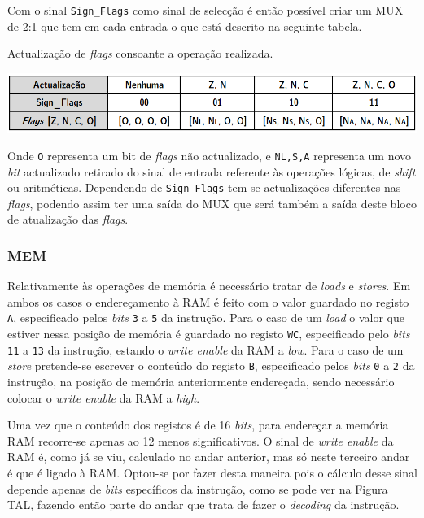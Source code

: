 \documentclass[11pt]{article}
\numberwithin{equation}{section}
\begin{document}
Com o sinal \texttt{Sign\_Flags} como sinal de selecção é então possível criar um MUX de 2:1 que tem em cada entrada o que está descrito na seguinte tabela.

\vspace{1.5mm}
\begin{table}[h]
	\centering
	\caption{Actualização de \textit{flags} consoante a operação realizada.}
	\vspace{-2mm}
 	\includegraphics[keepaspectratio=true, scale=0.45]{tabelas/tabelaFlags}
\end{table}

Onde \texttt{O} representa um bit de \textit{flags} não actualizado, e \texttt{N{\scriptsize {L,S,A}}} representa um novo \textit{bit} actualizado retirado do sinal de entrada referente às operações lógicas, de \textit{shift} ou aritméticas. Dependendo de \texttt{Sign\_Flags} tem-se actualizações diferentes nas \textit{flags}, podendo assim ter uma saída do MUX que será também a saída deste bloco de atualização das \textit{flags}.

\subsubsection{MEM}

Relativamente às operações de memória é necessário tratar de \textit{loads} e \textit{stores}. Em ambos os casos o endereçamento à RAM é feito com o valor guardado no registo \texttt{A}, especificado pelos \textit{bits} \texttt{3} a \texttt{5} da instrução. Para o caso de um \textit{load} o valor que estiver nessa posição de memória é guardado no registo \texttt{WC}, especificado pelo \textit{bits} \texttt{11} a \texttt{13} da instrução, estando o \textit{write enable} da RAM a \textit{low}. Para o caso de um \textit{store} pretende-se escrever o conteúdo do registo \texttt{B}, especificado pelos \textit{bits} \texttt{0} a \texttt{2} da instrução, na posição de memória anteriormente endereçada, sendo necessário colocar o \textit{write enable} da RAM a \textit{high}. 

Uma vez que o conteúdo dos registos é de 16 \textit{bits}, para endereçar a memória RAM recorre-se apenas ao 12 menos significativos. O sinal de \textit{write enable} da RAM é, como já se viu, calculado no andar anterior, mas só neste terceiro andar é que é ligado à RAM. Optou-se por fazer desta maneira pois o cálculo desse sinal depende apenas de \textit{bits} específicos da instrução, como se pode ver na Figura TAL, fazendo então parte do andar que trata de fazer o \textit{decoding} da instrução.
\end{document}
